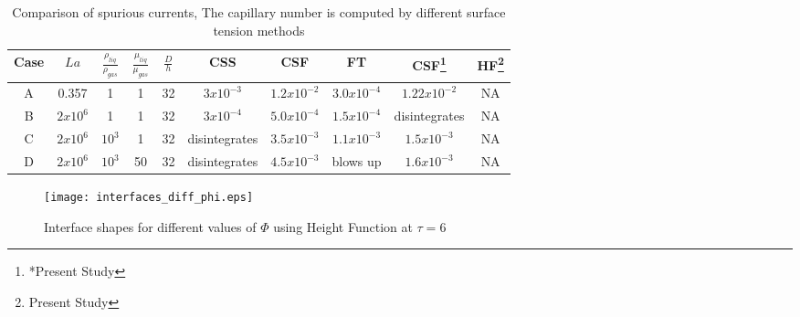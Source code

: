 \setlength\tabcolsep{1mm}

\begin{table}[t]
  \begin{center}
    \caption{Comparison of spurious currents, The capillary number is computed by different surface tension methods}
    \label{table:bp}
      \begin{tabular}{c c c c c c c c c c}
	\toprule
	Case & $La$ & $\frac{\rho_{liq}}{\rho_{gas}}$ & $\frac{\mu_{liq}}{\mu_{gas}}$ & $\frac{D}{h}$ & CSS & CSF & FT & CSF\footnote{*Present Study} & HF\footnote{ Present Study} \\
	\midrule
	A & 0.357 & 1 & 1 & 32 	& $3x10^{-3}$ & $1.2x10^{-2}$ & $3.0x10^{-4}$ & $1.22x10^{-2}$ & NA \\
	B & $2x10^{6}$ & 1 & 1 & 32 & $3x10^{-4}$ & $5.0x10^{-4}$ & $1.5x10^{-4}$ & disintegrates & NA \\
	C & $2x10^{6}$ & $10^3$ & 1 & 32 & disintegrates & $3.5x10^{-3}$ & $1.1x10^{-3}$ & $1.5x10^{-3}$ & NA \\
	D & $2x10^{6}$ & $10^3$ & 50 & 32 & disintegrates & $4.5x10^{-3}$ & blows up & $1.6x10^{-3}$ & NA \\ 
	\bottomrule
      \end{tabular}
    \end{center}
 \end{table}
 
  \begin{figure}
 \centering
 \texttt{[image: interfaces\_diff\_phi.eps]}
 \caption{Interface shapes for different values of $\Phi$ using Height Function at $\tau = 6$}
\end{figure}
 
